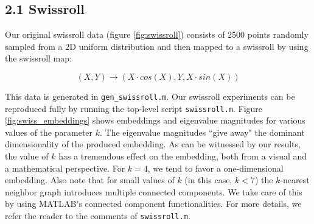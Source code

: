 \documentclass[a4paper,12pt]{report}
\begin{document}
\subsection*{2.1 Swissroll}

Our original swissroll data (figure \ref{fig:swissroll}) consists of 2500 points randomly sampled from a 2D uniform distribution and then mapped to a swissroll by using the swissroll map:

\begin{equation}
 (X, Y) \rightarrow (X \cdot cos(X), Y, X\cdot sin(X))
\label{eq:swiss_map}
\end{equation}

This data is generated in \texttt{gen\_swissroll.m}. Our swissroll experiments can be reproduced fully by running the top-level script \texttt{swissroll.m}. Figure \ref{fig:swiss_embeddings} shows embeddings and eigenvalue magnitudes for various values of the parameter $k$. The eigenvalue magnitudes ``give away" the dominant dimensionality of the produced embedding. As can be witnessed by our results, the value of $k$ has
a tremendous effect on the embedding, both from a visual and a mathematical perspective. For $k=4$, we tend to favor a one-dimensional embedding. Also note that for small values of $k$ (in this case, $k < 7$) the $k$-nearest neighbor graph introduces multiple connected components. We take care of this by using MATLAB's connected component functionalities. For more details, we refer the reader to the comments of \texttt{swissroll.m}.
\end{document}
